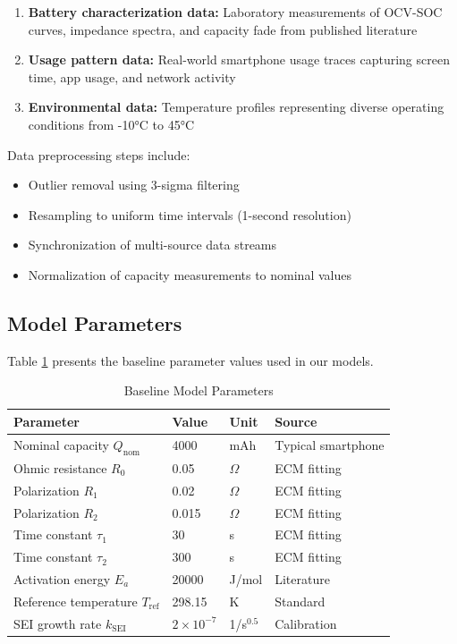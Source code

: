 \begin{enumerate}
    \item \textbf{Battery characterization data:} Laboratory measurements of OCV-SOC curves, impedance spectra, and capacity fade from published literature \cite{chen2021, bole2014}
    
    \item \textbf{Usage pattern data:} Real-world smartphone usage traces capturing screen time, app usage, and network activity
    
    \item \textbf{Environmental data:} Temperature profiles representing diverse operating conditions from -10°C to 45°C
\end{enumerate}

Data preprocessing steps include:
\begin{itemize}
    \item Outlier removal using 3-sigma filtering
    \item Resampling to uniform time intervals (1-second resolution)
    \item Synchronization of multi-source data streams
    \item Normalization of capacity measurements to nominal values
\end{itemize}

\subsection{Model Parameters}

Table \ref{tab:parameters} presents the baseline parameter values used in our models.

\begin{table}[H]
\centering
\caption{Baseline Model Parameters}
\label{tab:parameters}
\begin{tabular}{llll}
\toprule
\textbf{Parameter} & \textbf{Value} & \textbf{Unit} & \textbf{Source} \\
\midrule
Nominal capacity $Q_{\text{nom}}$ & 4000 & mAh & Typical smartphone \\
Ohmic resistance $R_0$ & 0.05 & $\Omega$ & ECM fitting \\
Polarization $R_1$ & 0.02 & $\Omega$ & ECM fitting \\
Polarization $R_2$ & 0.015 & $\Omega$ & ECM fitting \\
Time constant $\tau_1$ & 30 & s & ECM fitting \\
Time constant $\tau_2$ & 300 & s & ECM fitting \\
Activation energy $E_a$ & 20000 & J/mol & Literature \\
Reference temperature $T_{\text{ref}}$ & 298.15 & K & Standard \\
SEI growth rate $k_{\text{SEI}}$ & $2\times10^{-7}$ & 1/s$^{0.5}$ & Calibration \\
\bottomrule
\end{tabular}
\end{table}
